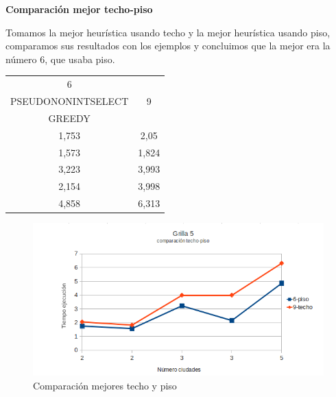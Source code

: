 \documentclass[a4paper,10pt]{article}
\begin{document}
\newpage

\textbf{Comparación mejor techo-piso}

Tomamos la mejor heurística usando techo y la mejor heurística usando piso, comparamos sus resultados con los ejemplos y concluimos que la mejor era la número $6$, que usaba piso.

\begin{table}
    \begin{tabular}{|c|c|}
        \hline
        6  \\ PSEUDONONINTSELECT & 9  \\ GREEDY \\ \hline
        1,753                            & 2,05              \\ \hline
        1,573                            & 1,824             \\ \hline
        3,223                            & 3,993             \\ \hline
        2,154                            & 3,998             \\ \hline
        4,858                            & 6,313             \\
        \hline
    \end{tabular}
\end{table}

\begin{figure}[ht]
\begin{minipage}[b]{1\linewidth}
 \centering
 \includegraphics[scale=0.4]{./grilla5ceilfloor.png}
 \caption{Comparación mejores techo y piso}
 \label{fig:grid5ceilfloor}
 \end{minipage}
\end{figure}
\end{document}
